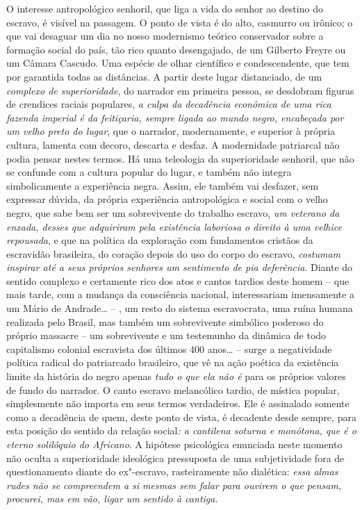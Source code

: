 O interesse antropológico senhoril, que liga a vida do senhor ao destino
do escravo, é visível na passagem. O ponto de vista é do alto, casmurro
ou irônico; o que vai desaguar um dia no nosso modernismo teórico
conservador sobre a formação social do país, tão rico quanto
desengajado, de um Gilberto Freyre ou um Câmara Cascudo. Uma espécie de
olhar científico e condescendente, que tem por garantida todas as
distâncias. A partir deste lugar distanciado, de um \emph{complexo de
superioridade}, do narrador em primeira pessoa, se desdobram figuras de
crendices raciais populares, \emph{a culpa da decadência econômica de
uma rica fazenda imperial é da feitiçaria, sempre ligada ao mundo negro,
encabeçada por um velho preto do lugar}, que o narrador, modernamente, e
superior à própria cultura, lamenta com decoro, descarta e desfaz. A
modernidade patriarcal não podia pensar nestes termos. Há uma teleologia
da superioridade senhoril, que não se confunde com a cultura popular do
lugar, e também não integra simbolicamente a experiência negra. Assim,
ele também vai desfazer, sem expressar dúvida, da própria experiência
antropológica e social com o velho negro, que sabe bem ser um
sobrevivente do trabalho escravo, \emph{um veterano da enxada, desses
que adquiriram pela existência laboriosa o direito à uma velhice
repousada}, e que na política da exploração com fundamentos cristãos da
escravidão brasileira, do coração depois do uso do corpo do escravo,
\emph{costumam inspirar até a seus próprios senhores um sentimento de
pia deferência}. Diante do sentido complexo e certamente rico dos atos e
cantos tardios deste homem -- que mais tarde, com a mudança da
consciência nacional, interessariam imensamente a um Mário de Andrade\ldots{}
-- , um resto do sistema escravocrata, uma ruína humana realizada pelo
Brasil, mas também um sobrevivente simbólico poderoso do próprio
massacre -- um sobrevivente e um testemunho da dinâmica de todo
capitalismo colonial escravista dos últimos 400 anos\ldots{} -- surge a
negatividade política radical do patriarcado brasileiro, que vê na ação
poética da existência limite da história do negro apenas \emph{tudo o
que ela não é} para os próprios valores de fundo do narrador. O canto
escravo melancólico tardio, de mística popular, simplesmente não importa
em seus termos verdadeiros. Ele é assinalado somente como a decadência
de quem, deste ponto de vista, é decadente desde sempre, para esta
posição do sentido da relação social\emph{: a cantilena soturna e
monótona, que é o eterno solilóquio do Africano}. A hipótese psicológica
enunciada neste momento não oculta a superioridade ideológica
pressuposta de uma subjetividade fora de questionamento diante do
ex"-escravo, rasteiramente não dialética: \emph{essa almas rudes não se
compreendem a si mesmas sem falar para ouvirem o que pensam, procurei,
mas em vão, ligar um sentido à cantiga. }

